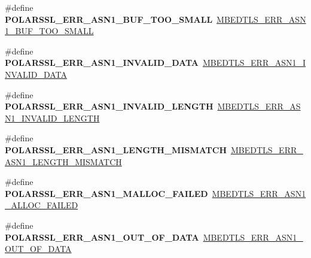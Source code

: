 \begin{DoxyCompactItemize}
\#define {\bfseries P\+O\+L\+A\+R\+S\+S\+L\+\_\+\+E\+R\+R\+\_\+\+A\+S\+N1\+\_\+\+B\+U\+F\+\_\+\+T\+O\+O\+\_\+\+S\+M\+A\+LL}~\mbox{\hyperlink{group__asn1__module_gaf9bf64017ed866c846b506e80dc15e94}{M\+B\+E\+D\+T\+L\+S\+\_\+\+E\+R\+R\+\_\+\+A\+S\+N1\+\_\+\+B\+U\+F\+\_\+\+T\+O\+O\+\_\+\+S\+M\+A\+LL}}
\item 
\mbox{\label{compat-1_83_8h_a6dab8f2bf2ddd7e0c9f274267ab6aa30}} 
\#define {\bfseries P\+O\+L\+A\+R\+S\+S\+L\+\_\+\+E\+R\+R\+\_\+\+A\+S\+N1\+\_\+\+I\+N\+V\+A\+L\+I\+D\+\_\+\+D\+A\+TA}~\mbox{\hyperlink{group__asn1__module_ga9ac36bf8c63a9968afe1d35d0569e4d8}{M\+B\+E\+D\+T\+L\+S\+\_\+\+E\+R\+R\+\_\+\+A\+S\+N1\+\_\+\+I\+N\+V\+A\+L\+I\+D\+\_\+\+D\+A\+TA}}
\item 
\mbox{\label{compat-1_83_8h_a05662cd7f7290c3de3e74598f0a60b7e}} 
\#define {\bfseries P\+O\+L\+A\+R\+S\+S\+L\+\_\+\+E\+R\+R\+\_\+\+A\+S\+N1\+\_\+\+I\+N\+V\+A\+L\+I\+D\+\_\+\+L\+E\+N\+G\+TH}~\mbox{\hyperlink{group__asn1__module_ga0ebe8e0a4894533db505303504eea59b}{M\+B\+E\+D\+T\+L\+S\+\_\+\+E\+R\+R\+\_\+\+A\+S\+N1\+\_\+\+I\+N\+V\+A\+L\+I\+D\+\_\+\+L\+E\+N\+G\+TH}}
\item 
\mbox{\label{compat-1_83_8h_affc1c105d348cf2be47a2c8d6ab5ef63}} 
\#define {\bfseries P\+O\+L\+A\+R\+S\+S\+L\+\_\+\+E\+R\+R\+\_\+\+A\+S\+N1\+\_\+\+L\+E\+N\+G\+T\+H\+\_\+\+M\+I\+S\+M\+A\+T\+CH}~\mbox{\hyperlink{group__asn1__module_gacf6fad8d80fa050c3463539412674a20}{M\+B\+E\+D\+T\+L\+S\+\_\+\+E\+R\+R\+\_\+\+A\+S\+N1\+\_\+\+L\+E\+N\+G\+T\+H\+\_\+\+M\+I\+S\+M\+A\+T\+CH}}
\item 
\mbox{\label{compat-1_83_8h_a37e8d5745c2724e7330566921ca16fec}} 
\#define {\bfseries P\+O\+L\+A\+R\+S\+S\+L\+\_\+\+E\+R\+R\+\_\+\+A\+S\+N1\+\_\+\+M\+A\+L\+L\+O\+C\+\_\+\+F\+A\+I\+L\+ED}~\mbox{\hyperlink{group__asn1__module_gab7d40360e48e414ffa1a4df1961723d2}{M\+B\+E\+D\+T\+L\+S\+\_\+\+E\+R\+R\+\_\+\+A\+S\+N1\+\_\+\+A\+L\+L\+O\+C\+\_\+\+F\+A\+I\+L\+ED}}
\item 
\mbox{\label{compat-1_83_8h_a0274145c2843f1d22cf7ca9b7ed37bab}} 
\#define {\bfseries P\+O\+L\+A\+R\+S\+S\+L\+\_\+\+E\+R\+R\+\_\+\+A\+S\+N1\+\_\+\+O\+U\+T\+\_\+\+O\+F\+\_\+\+D\+A\+TA}~\mbox{\hyperlink{group__asn1__module_ga284c12cf03a4ffeee89a63750f00dfdd}{M\+B\+E\+D\+T\+L\+S\+\_\+\+E\+R\+R\+\_\+\+A\+S\+N1\+\_\+\+O\+U\+T\+\_\+\+O\+F\+\_\+\+D\+A\+TA}}

\end{DoxyCompactItemize}
